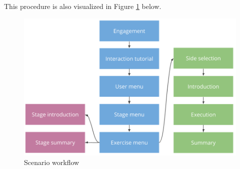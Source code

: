 This procedure is also visualized in Figure \ref{fig:scenarioWorkflow} below.
\begin{figure}[htb]
	\centering
	\begin{minipage}[t]{1\linewidth}
		\centering
		\includegraphics[width=0.79\linewidth]{Pictures/conceptScenarioFlow}
		\caption{Scenario workflow}
		\label{fig:scenarioWorkflow}
	\end{minipage}
\end{figure}